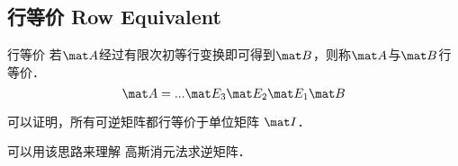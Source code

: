 \subsection{行等价 Row Equivalent}
\begin{definition}{行等价}
若$\mat A$经过有限次初等行变换即可得到$\mat B$，则称$\mat A$与$\mat B$行等价．
\begin{equation}
\mat A= ... \mat E_3 \mat E_2 \mat E_1 \mat  B
\end{equation}
\end{definition}

可以证明，所有可逆矩阵都行等价于单位矩阵 $\mat I$．

可以用该思路来理解 高斯消元法求逆矩阵．
